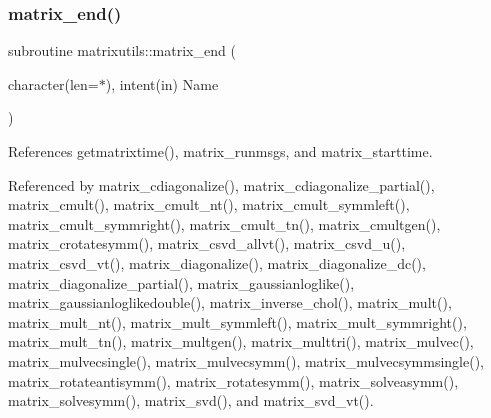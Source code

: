 \subsubsection{\texorpdfstring{matrix\+\_\+end()}{matrix\_end()}}
{\footnotesize\ttfamily subroutine matrixutils\+::matrix\+\_\+end (\begin{DoxyParamCaption}\item[{character(len=$\ast$), intent(in)}]{Name }\end{DoxyParamCaption})}



References getmatrixtime(), matrix\+\_\+runmsgs, and matrix\+\_\+starttime.



Referenced by matrix\+\_\+cdiagonalize(), matrix\+\_\+cdiagonalize\+\_\+partial(), matrix\+\_\+cmult(), matrix\+\_\+cmult\+\_\+nt(), matrix\+\_\+cmult\+\_\+symmleft(), matrix\+\_\+cmult\+\_\+symmright(), matrix\+\_\+cmult\+\_\+tn(), matrix\+\_\+cmultgen(), matrix\+\_\+crotatesymm(), matrix\+\_\+csvd\+\_\+allvt(), matrix\+\_\+csvd\+\_\+u(), matrix\+\_\+csvd\+\_\+vt(), matrix\+\_\+diagonalize(), matrix\+\_\+diagonalize\+\_\+dc(), matrix\+\_\+diagonalize\+\_\+partial(), matrix\+\_\+gaussianloglike(), matrix\+\_\+gaussianloglikedouble(), matrix\+\_\+inverse\+\_\+chol(), matrix\+\_\+mult(), matrix\+\_\+mult\+\_\+nt(), matrix\+\_\+mult\+\_\+symmleft(), matrix\+\_\+mult\+\_\+symmright(), matrix\+\_\+mult\+\_\+tn(), matrix\+\_\+multgen(), matrix\+\_\+multtri(), matrix\+\_\+mulvec(), matrix\+\_\+mulvecsingle(), matrix\+\_\+mulvecsymm(), matrix\+\_\+mulvecsymmsingle(), matrix\+\_\+rotateantisymm(), matrix\+\_\+rotatesymm(), matrix\+\_\+solveasymm(), matrix\+\_\+solvesymm(), matrix\+\_\+svd(), and matrix\+\_\+svd\+\_\+vt().

